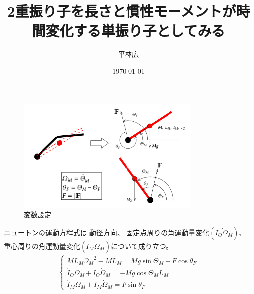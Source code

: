 \documentclass[a4paper,11pt]{jsarticle}
\begin{document}
\title{2重振り子を長さと慣性モーメントが時間変化する単振り子としてみる}
\author{平林広}
\date{\today}
\maketitle


\begin{figure}[h]
  \centering
  \includegraphics[width = 0.8\textwidth]{config.png}
  \caption{変数設定}
  \label{config.png}
\end{figure}

ニュートンの運動方程式は
動径方向、
固定点周りの角運動量変化$(\dot{I_O\Omega_M})$、
重心周りの角運動量変化$(\dot{I_M\Omega_M})$について成り立つ。
\begin{gather*}
  \begin{cases}
    ML_M{\Omega_M}^2 - M\ddot{L}_M = Mg\sin\Theta_M - F\cos\theta_F
    \\
    \dot{I}_O \Omega_M + I_O \dot{\Omega}_M = -Mg\cos\Theta_M L_M
    \\
    \dot{I}_M \Omega_M + I_M \dot{\Omega}_M = F\sin\theta_F
  \end{cases}
\end{gather*}
\end{document}

